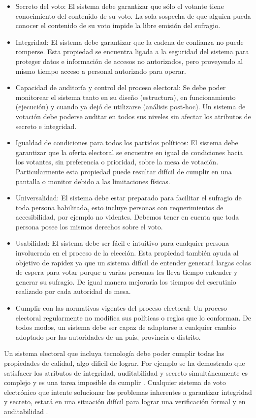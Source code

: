 \begin{itemize}
    \item Secreto del voto: El sistema debe garantizar que sólo el votante tiene conocimiento del contenido de su voto. La sola sospecha de que alguien pueda conocer el contenido de su voto impide la libre emisión del sufragio.
    \item Integridad: El sistema debe garantizar que la cadena de confianza no puede romperse. Esta propiedad se encuentra ligada a la seguridad del sistema para proteger datos e información de accesos no autorizados, pero proveyendo al mismo tiempo acceso a personal autorizado para operar.
    \item Capacidad de auditoría y control del proceso electoral: Se debe poder monitorear el sistema tanto en su diseño (estructura), en funcionamiento (ejecución) y cuando ya dejó de utilizarse (análisis post-hoc). Un sistema de votación debe poderse auditar en todos sus niveles sin afectar los atributos de secreto e integridad.
    \item Igualdad de condiciones para todos los partidos políticos: El sistema debe garantizar que la oferta electoral se encuentre en igual de condiciones hacia los votantes, sin preferencia o prioridad, sobre la mesa de votación. Particularmente esta propiedad puede resultar difícil de cumplir en una pantalla o monitor debido a las limitaciones físicas.
    \item Universalidad: El sistema debe estar preparado para facilitar el sufragio de toda persona habilitada, esto incluye personas con requerimientos de accesibilidad, por ejemplo no videntes. Debemos tener en cuenta que toda persona posee los mismos derechos sobre el voto.
    \item Usabilidad: El sistema debe ser fácil e intuitivo para cualquier persona involucrada en el proceso de la elección. Esta propiedad también ayuda al objetivo de rapidez ya que un sistema difícil de entender generará largas colas de espera para votar porque a varias personas les lleva tiempo entender y generar su sufragio. De igual manera mejoraría los tiempos del escrutinio realizado por cada autoridad de mesa.
    \item Cumplir con las normativas vigentes del proceso electoral: Un proceso electoral regularmente no modifica sus políticas o reglas que lo conforman. De todos modos, un sistema debe ser capaz de adaptarse a cualquier cambio adoptado por las autoridades de un país, provincia o distrito.
\end{itemize}
Un sistema electoral que incluya tecnología debe poder cumplir todas las propiedades de calidad, algo dificil de lograr. Por ejemplo se ha demostrado que satisfacer los atributos de integridad, auditabilidad y secreto simultáneamente es complejo y es una tarea imposible de cumplir \cite{vora}. Cualquier sistema de voto electrónico que intente solucionar los problemas inherentes a garantizar integridad y secreto, estará en una situación difícil para lograr una verificación formal y en auditabilidad \cite{conicet}.
